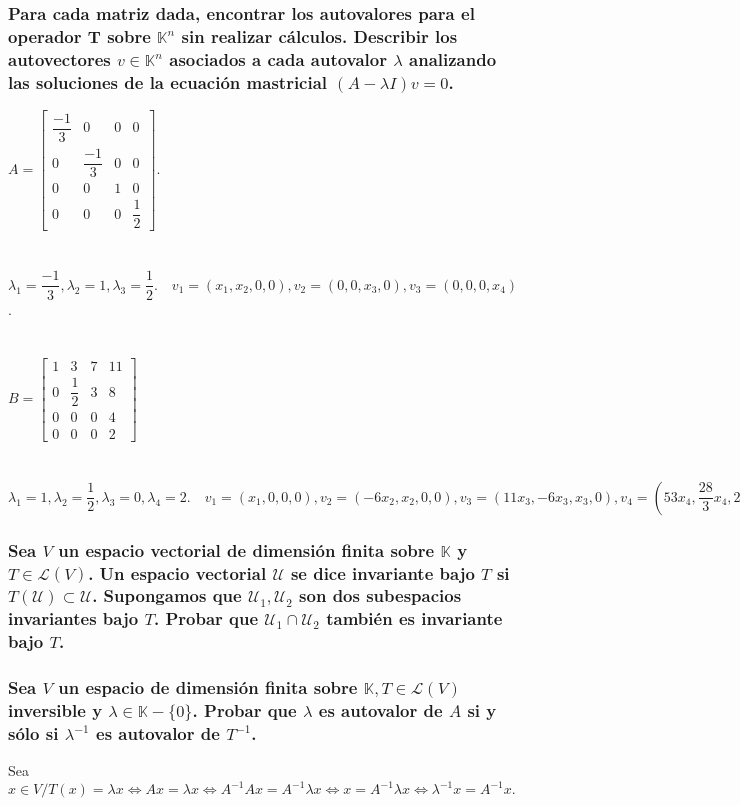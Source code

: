 \documentclass{article}
\begin{document}
\subsubsection{Para cada matriz dada, encontrar los autovalores para el operador T sobre $\mathbb{K}^n$ sin realizar cálculos. Describir los
autovectores $v \in \mathbb{K}^n$ asociados a cada autovalor $\lambda$ analizando las soluciones de la ecuación mastricial $(A - \lambda I)v=0$.}
$A = \begin{bmatrix} \dfrac{-1}3&0&0&0 \\ 0&\dfrac{-1}3&0&0 \\ 0&0&1&0 \\ 0&0&0&\dfrac{1}2 \end{bmatrix}$. \\ \\ \\
$\lambda_1 = \dfrac{-1}3, \lambda_2 = 1, \lambda_3 = \dfrac{1}2. \quad v_1 = (x_1,x_2,0,0), v_2 = (0,0,x_3,0), v_3 = (0,0,0,x_4)$. \\ \\ \\
$B = \begin{bmatrix} 1&3&7&11 \\ 0&\dfrac{1}2&3&8 \\ 0&0&0&4 \\ 0&0&0&2 \end{bmatrix} $ \\ \\ \\
$\lambda_1 = 1, \lambda_2=\dfrac{1}2, \lambda_3 = 0, \lambda_4=2. \quad v_1 = (x_1,0,0,0), v_2=(-6x_2,x_2,0,0), v_3=(11x_3,-6x_3,x_3,0),
v_4=(53x_4,\dfrac{28}3x_4,2x_4,x_4)$
\subsubsection{Sea $V$ un espacio vectorial de dimensión finita sobre $\mathbb{K}$ y $T \in \mathcal{L}(V)$. Un espacio vectorial
$\mathcal{U}$ se dice invariante bajo $T$ si $T(\mathcal{U}) \subset \mathcal{U}$. Supongamos que $\mathcal{U}_1,\mathcal{U}_2$ son dos subespacios
invariantes bajo $T$. Probar que $\mathcal{U}_1\cap\mathcal{U}_2$ también es invariante bajo $T$.}

\subsubsection{Sea $V$ un espacio de dimensión finita sobre $\mathbb{K}, T \in \mathcal{L}(V)$ inversible y $\lambda \in \mathbb{K}-\{0 \}$.
Probar que $\lambda$ es autovalor de $A$ si y sólo si $\lambda^{-1}$ es autovalor de $T^{-1}$.} 
Sea $x \in V / T(x) = \lambda x \Longleftrightarrow Ax = \lambda x \Longleftrightarrow A^{-1}Ax = A^{-1}\lambda x \Longleftrightarrow
x = A^{-1}\lambda x \Longleftrightarrow \lambda^{-1}x = A^{-1}x.$
\end{document}

